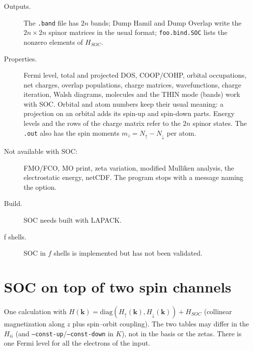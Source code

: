 \begin{description}
\item[Outputs.] The {\tt .band} file has $2n$ bands; {\sf Dump Hamil}
  and {\sf Dump Overlap} write the $2n\times2n$ spinor matrices in the
  usual format; {\tt foo.bind.SOC} lists the nonzero elements of
  $H_{SOC}$.
\item[Properties.] Fermi level, total and projected DOS, COOP/COHP,
  orbital occupations, net charges, overlap populations, charge
  matrices, wavefunctions, charge iteration, Walsh diagrams, molecules
  and the THIN mode (bands) work with SOC. Orbital and atom numbers keep
  their usual meaning: a projection on an orbital adds its spin-up and
  spin-down parts. Energy levels and the rows of the charge matrix refer
  to the $2n$ spinor states. The {\tt .out} also has the spin moments
  $m_z=N_\uparrow-N_\downarrow$ per atom.
\item[Not available with SOC:] FMO/FCO, {\sf MO print}, zeta variation,
  modified Mulliken analysis, the electrostatic energy, netCDF. The
  program stops with a message naming the option.
\item[Build.] SOC needs \calcprog built with LAPACK.
\item[f shells.] SOC in $f$ shells is implemented but has not been
  validated.
\end{description}

\section{SOC on top of two spin channels}


One calculation with $H(\mathbf{k}) = \mathrm{diag}(H_\uparrow(\mathbf{k}),
H_\downarrow(\mathbf{k})) + H_{SOC}$ (collinear magnetization along $z$
plus spin--orbit coupling). The two tables may differ in the $H_{ii}$
(and {\tt --const-up}/{\tt --const-down} in $K$), not in the basis or
the zetas. There is one Fermi level for all the electrons of the input.
\fussy
